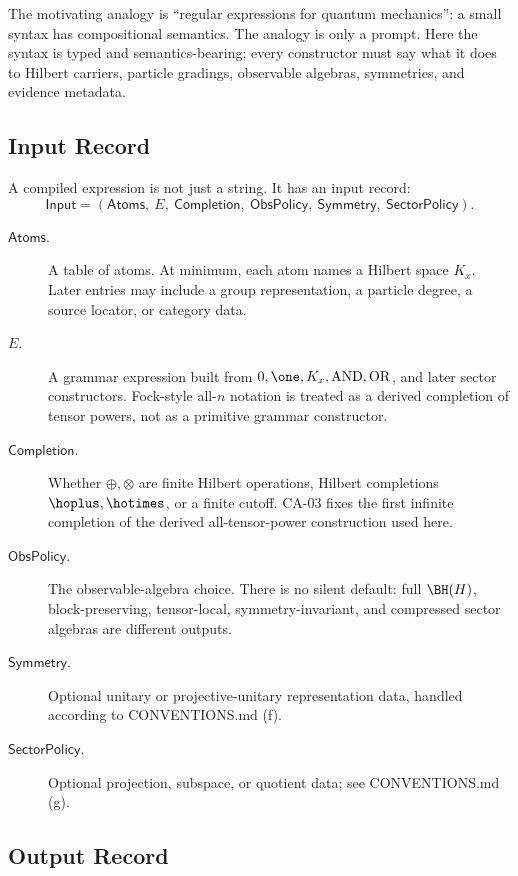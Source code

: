 The motivating analogy is ``regular expressions for quantum mechanics'': a small
syntax has compositional semantics.  The analogy is only a prompt.  Here the
syntax is typed and semantics-bearing; every constructor must say what it does to
Hilbert carriers, particle gradings, observable algebras, symmetries, and
evidence metadata.

\subsection{Input Record}

A compiled expression is not just a string.  It has an input record:
\[
  \mathsf{Input}
  =
  (\mathsf{Atoms},\ E,\ \mathsf{Completion},\ \mathsf{ObsPolicy},\
   \mathsf{Symmetry},\ \mathsf{SectorPolicy}).
\]

\begin{description}
\item[\(\mathsf{Atoms}\).]
A table of atoms.  At minimum, each atom names a Hilbert space \(K_x\).  Later
entries may include a group representation, a particle degree, a source locator,
or category data.
\item[\(E\).]
A grammar expression built from \(0,\one,K_x,\operatorname{AND},\operatorname{OR}\),
and later sector constructors.  Fock-style all-\(n\) notation is treated as a
derived completion of tensor powers, not as a primitive grammar constructor.
\item[\(\mathsf{Completion}\).]
Whether \(\oplus,\otimes\) are finite Hilbert operations, Hilbert completions
\(\hoplus,\hotimes\), or a finite cutoff.  CA-03 fixes the first infinite
completion of the derived all-tensor-power construction used here.
\item[\(\mathsf{ObsPolicy}\).]
The observable-algebra choice.  There is no silent default: full
\(\BH(H)\), block-preserving, tensor-local, symmetry-invariant, and compressed
sector algebras are different outputs.
\item[\(\mathsf{Symmetry}\).]
Optional unitary or projective-unitary representation data, handled according to
CONVENTIONS.md (f).
\item[\(\mathsf{SectorPolicy}\).]
Optional projection, subspace, or quotient data; see CONVENTIONS.md (g).
\end{description}

\subsection{Output Record}

